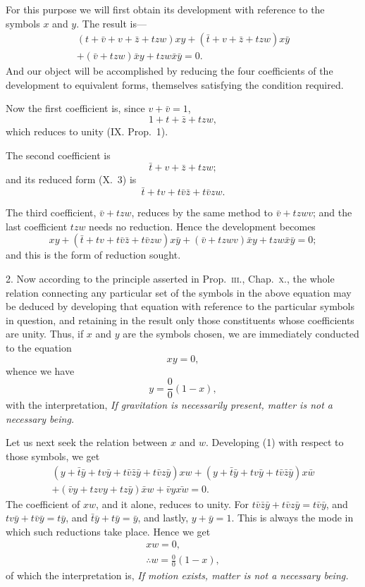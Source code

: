 \documentclass[oneside]{book}
\begin{document}
For this purpose we will first obtain its development with
reference to the symbols $x$ and $y$. The result is---
\[
\begin{split}
  (t + \bar{v} + v + \bar{z} + tzw) xy
   + (\bar{t} + v + \bar{z} + tzw) x\bar{y}   \\
   + (\bar{v} + tzw) \bar{x}y + tzw\bar{x}\bar{y} = 0.
\end{split}
\]
And our object will be accomplished by reducing the four coefficients of the development to equivalent forms, themselves satisfying the condition required.

Now the first coefficient is, since $v + \bar{v} = 1$,
\[
1 + t + \bar{z} + tzw,
\]
which reduces to unity (IX. Prop.~1).

The second coefficient is
\[
  \bar{t} + v + \bar{z} + tzw;
\]
and its reduced form (X.~3) is
\[
  \bar{t} + tv + t\bar{v}\bar{z} + t\bar{v}zw.
\]

The third coefficient, $\bar{v} + tzw$, reduces by the same method
to $\bar{v} + tzwv$; and the last coefficient $tzw$ needs no reduction.
Hence the development becomes
\[
  xy
+ \left(\bar{t} + tv  + t\bar{v}\bar{z} + t\bar{v}zw\right)x\bar{y}
+ \left(\bar{v}  + tzwv\right) \bar{x}y
+ tzw\bar{x}\bar{y} = 0; \tag{1}
\]
and this is the form of reduction sought.

2. Now according to the principle asserted in Prop.~\textsc{iii}.,
Chap.~\textsc{x}., the whole relation connecting any particular set of the
symbols in the above equation may be deduced by developing
that equation with reference to the particular symbols in question,
and retaining in the result only those constituents whose coefficients
are unity. Thus, if $x$ and $y$ are the symbols chosen, we
are immediately conducted to the equation
\[
xy=0,
\]
whence we have
\[
y=\frac{0}{0}(1-x),
\]
with the interpretation, \emph{If gravitation is necessarily present, matter
is not a necessary being.}

Let us next seek the relation between $x$ and $w$. Developing
(1) with respect to those symbols, we get
\begin{multline*}
  \left(y + \bar{t}\bar{y} + tv\bar{y} + t\bar{v}\bar{z}\bar{y}
      + t\bar{v}z\bar{y}\right)xw
+ \left(y + \bar{t}\bar{y} + tv\bar{y}
      + t\bar{v}\bar{z}\bar{y}\right)x\bar{w}
\\
+ \left(\bar{v}y + tzvy + tz\bar{y}\right)\bar{x}w
+ \bar{v}y\bar{xw} = 0.
\end{multline*}
The coefficient of $xw$, and it alone, reduces to unity. For
$t\bar{v}\bar{z}\bar{y} + t\bar{v}z\bar{y} = t\bar{v}\bar{y}$, and
$tv\bar{y} + t\bar{v}\bar{y} = t\bar{y}$, and
$\bar{t}\bar{y} + t\bar{y} = \bar{y}$, and lastly,
$y + \bar{y} = 1$. This is always the mode in which such reductions
take place. Hence we get
\begin{gather*}
xw=0,
\\
\therefore w = \frac{0}{0}(1-x),
\end{gather*}
of which the interpretation is, \emph{If motion exists, matter is not a necessary
being.}
\end{document}

